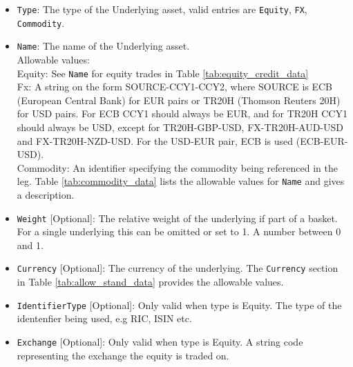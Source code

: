 \begin{itemize}

\item \lstinline!Type!:
The type of the Underlying asset, valid entries are \lstinline!Equity!, \lstinline!FX!, \lstinline!Commodity!.

\item \lstinline!Name!:
The name of the Underlying asset. \\
Allowable values:  \\
Equity: See \lstinline!Name! for equity trades in Table \ref{tab:equity_credit_data} \\
Fx: A string on the form SOURCE-CCY1-CCY2, where SOURCE is ECB (European Central Bank) for EUR pairs or TR20H (Thomson Reuters 20H) for USD pairs. For ECB CCY1 should always be EUR, and for TR20H CCY1 should always be USD, except for TR20H-GBP-USD, FX-TR20H-AUD-USD and FX-TR20H-NZD-USD. For the USD-EUR pair, ECB is used (ECB-EUR-USD). \\
Commodity: An identifier specifying the commodity being referenced in the leg. 
Table \ref{tab:commodity_data} lists the allowable values for \lstinline!Name! and gives a description. \\
\item \lstinline!Weight! [Optional]:
The relative weight of the underlying if part of a basket. For a single underlying this can be omitted or set to 1. A number between 0 and 1.

\item \lstinline!Currency! [Optional]:
The currency of the underlying. The \lstinline!Currency! section in Table \ref{tab:allow_stand_data} provides the allowable values.

\item \lstinline!IdentifierType! [Optional]:
Only valid when type is Equity. The type of the identenfier being used, e.g RIC, ISIN etc.

\item \lstinline!Exchange! [Optional]:
Only valid when type is Equity. A string code representing the exchange the equity is traded on.


\end{itemize}
